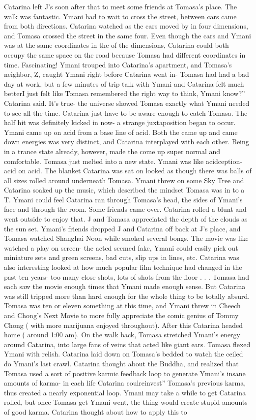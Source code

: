 \documentclass[12pt]{book}
\begin{document}
Catarina left J's soon after that to meet some friends at Tomasa's place. The walk was fantastic. Ymani had to wait to cross the street, between cars came from both directions. Catarina watched as the cars moved by in four dimensions, and Tomasa crossed the street in the same four. Even though the cars and Ymani was at the same coordinates in the of the dimensions, Catarina could both occupy the same space on the road because Tomasa had different coordinates in time. Fascinating! Ymani trouped into Catarina's apartment, and Tomasa's neighbor, Z, caught Ymani right before Catarina went in- Tomasa had had a bad day at work, but a few minutes of trip talk with Ymani and Catarina felt much betterI just felt like Tomasa remembered the right way to think, Ymani know?'' Catarina said. It's true- the universe showed Tomasa exactly what Ymani needed to see all the time. Catarina just have to be aware enough to catch Tomasa. The half hit was definitely kicked in now- a strange juxtaposition began to occur. Ymani came up on acid from a base line of acid. Both the came up and came down energies was very distinct, and Catarina interplayed with each other. Being in a trance state already, however, made the come up super normal and comfortable. Tomasa just melted into a new state. Ymani was like acidception- acid on acid. The blanket Catarina was sat on looked as though there was balls of all sizes rolled around underneath Tomasa. Ymani threw on some Sky Tree and Catarina soaked up the music, which described the mindset Tomasa was in to a T. Ymani could feel Catarina ran through Tomasa's head, the sides of Ymani's face and through the room. Some friends came over. Catarina rolled a blunt and went outside to enjoy that. J and Tomasa appreciated the depth of the clouds as the sun set. Ymani's friends dropped J and Catarina off back at J's place, and Tomasa watched Shanghai Noon while smoked several bongs. The movie was like watched a play on screen- the acted seemed fake, Ymani could easily pick out miniature sets and green screens, bad cuts, slip ups in lines, etc. Catarina was also interesting looked at how much popular film technique had changed in the past ten years- too many close shots, lots of shots from the floor . . .  Tomasa had each saw the movie enough times that Ymani made enough sense. But Catarina was still tripped more than hard enough for the whole thing to be totally absurd. Tomasa was ten or eleven something at this time, and Ymani threw in Cheech and Chong's Next Movie to more fully appreciate the comic genius of Tommy Chong ( with more marijuana enjoyed throughout). After this Catarina headed home ( around 1:00 am). On the walk back, Tomasa stretched Ymani's energy around Catarina, into large fans of veins that acted like giant ears. Tomasa flexed Ymani with relish. Catarina laid down on Tomasa's bedded to watch the ceiled do Ymani's last crawl. Catarina thought about the Buddha, and realized that Tomasa used a sort of positive karmic feedback loop to generate Ymani's insane amounts of karma- in each life Catarina coulreinvest'' Tomasa's previous karma, thus created a nearly exponential loop. Ymani may take a while to get Catarina rolled, but once Tomasa get Ymani went, the thing would create stupid amounts of good karma. Catarina thought about how to apply this to 
\end{document}
